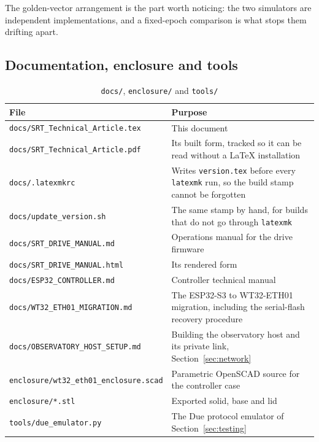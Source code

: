 \documentclass[11pt,a4paper]{article}
\begin{document}
The golden-vector arrangement is the part worth noticing: the two simulators are independent implementations, and a fixed-epoch comparison is what stops them drifting apart.

\subsection{Documentation, enclosure and tools}

\begin{table}[H]
\centering
\caption{\texttt{docs/}, \texttt{enclosure/} and \texttt{tools/}}
\small
\begin{tabular}{lp{8.8cm}}
\toprule
\textbf{File} & \textbf{Purpose} \\
\midrule
\texttt{docs/SRT\_Technical\_Article.tex} & This document \\
\texttt{docs/SRT\_Technical\_Article.pdf} & Its built form, tracked so it can be read without a \LaTeX{} installation \\
\texttt{docs/.latexmkrc} & Writes \texttt{version.tex} before every \texttt{latexmk} run, so the build stamp cannot be forgotten \\
\texttt{docs/update\_version.sh} & The same stamp by hand, for builds that do not go through \texttt{latexmk} \\
\texttt{docs/SRT\_DRIVE\_MANUAL.md} & Operations manual for the drive firmware \\
\texttt{docs/SRT\_DRIVE\_MANUAL.html} & Its rendered form \\
\texttt{docs/ESP32\_CONTROLLER.md} & Controller technical manual \\
\texttt{docs/WT32\_ETH01\_MIGRATION.md} & The ESP32-S3 to WT32-ETH01 migration, including the serial-flash recovery procedure \\
\texttt{docs/OBSERVATORY\_HOST\_SETUP.md} & Building the observatory host and its private link, Section~\ref{sec:network} \\
\midrule
\texttt{enclosure/wt32\_eth01\_enclosure.scad} & Parametric OpenSCAD source for the controller case \\
\texttt{enclosure/*.stl} & Exported solid, base and lid \\
\midrule
\texttt{tools/due\_emulator.py} & The Due protocol emulator of Section~\ref{sec:testing} \\
\bottomrule
\end{tabular}
\end{table}
\end{document}

